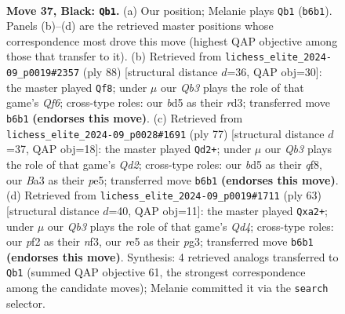 \documentclass[11pt]{article}
\begin{document}
\clearpage

\begin{figure}[p]\centering
\begin{subfigure}{0.46\textwidth}\centering
\resizebox{\linewidth}{!}{%
\newchessgame
\chessboard[
  setfen={8/pp4kp/1q4p1/3BR3/6PP/b7/5PK1/8 b - - 0 37},
  showmover=false,
  pgfstyle=straightmove, color=movearrow, markmove={b6-b1}
]}
\caption{}
\end{subfigure}\hfill
\begin{subfigure}{0.46\textwidth}\centering
\resizebox{\linewidth}{!}{%
\newchessgame
\chessboard[
  setfen={8/p1kr4/3p1QP1/2pP1PK1/8/3r4/P7/8 w - - 0 45},
  showmover=false,
  pgfstyle=straightmove, color=movearrow, markmove={f6-f8}
]}
\caption{}
\end{subfigure}
\\[4pt]
\begin{subfigure}{0.46\textwidth}\centering
\resizebox{\linewidth}{!}{%
\newchessgame
\chessboard[
  setfen={1R3Q2/3q1p1k/6p1/4Pp1p/P7/7P/2P3K1/8 b - - 0 39},
  showmover=false,
  pgfstyle=straightmove, color=movearrow, markmove={d7-d2}
]}
\caption{}
\end{subfigure}\hfill
\begin{subfigure}{0.46\textwidth}\centering
\resizebox{\linewidth}{!}{%
\newchessgame
\chessboard[
  setfen={8/5pkp/3p2p1/3q4/5B2/3p1NP1/P4K2/5R2 b - - 1 32},
  showmover=false,
  pgfstyle=straightmove, color=movearrow, markmove={d5-a2}
]}
\caption{}
\end{subfigure}
\caption{\textbf{Move 37, Black: \texttt{Qb1}.} (a) Our position; Melanie plays \texttt{Qb1} (\texttt{b6b1}). Panels (b)--(d) are the retrieved master positions whose correspondence most drove this move (highest QAP objective among those that transfer to it). (b) Retrieved from \texttt{lichess\_elite\_2024-09\_p0019\#2357} (ply 88) [structural distance $d$=36, QAP obj=30]: the master played \texttt{Qf8}; under $\mu$ our \emph{Qb3} plays the role of that game's \emph{Qf6}; cross-type roles: our \emph{b}d5 as their \emph{r}d3; transferred move \texttt{b6b1} \textbf{(endorses this move)}. (c) Retrieved from \texttt{lichess\_elite\_2024-09\_p0028\#1691} (ply 77) [structural distance $d$=37, QAP obj=18]: the master played \texttt{Qd2+}; under $\mu$ our \emph{Qb3} plays the role of that game's \emph{Qd2}; cross-type roles: our \emph{b}d5 as their \emph{q}f8, our \emph{B}a3 as their \emph{p}e5; transferred move \texttt{b6b1} \textbf{(endorses this move)}. (d) Retrieved from \texttt{lichess\_elite\_2024-09\_p0019\#1711} (ply 63) [structural distance $d$=40, QAP obj=11]: the master played \texttt{Qxa2+}; under $\mu$ our \emph{Qb3} plays the role of that game's \emph{Qd4}; cross-type roles: our \emph{p}f2 as their \emph{n}f3, our \emph{r}e5 as their \emph{p}g3; transferred move \texttt{b6b1} \textbf{(endorses this move)}. Synthesis: 4 retrieved analogs transferred to \texttt{Qb1} (summed QAP objective 61, the strongest correspondence among the candidate moves); Melanie committed it via the \texttt{search} selector.}
\label{fig:thought-m73}
\end{figure}
\end{document}
